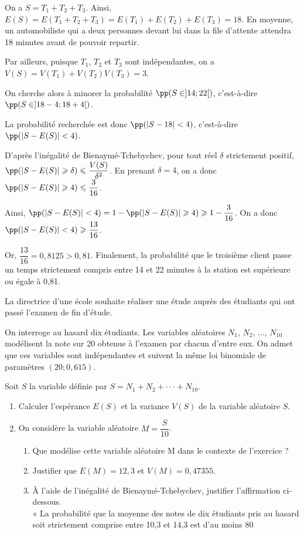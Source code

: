 \documentclass[11pt,fleqn, openany]{book} %
\begin{document}
\begin{solution}
On a $S=T_1+T_2+T_3$. Ainsi, $E(S)=E(T_1+T_2+T_3)=E(T_1)+E(T_2)+E(T_3)=18$. En moyenne, un automobiliste qui a deux personnes devant lui dans la file d'attente attendra 18 minutes avant de pouvoir repartir.

Par ailleurs, puisque $T_1$, $T_2$ et $T_3$ sont indépendantes, on a $V(S)=V(T_1)+V(T_2)V(T_3)=3$.

On cherche alors à minorer la probabilité $\pp(S \in ]14;22[)$, c'est-à-dire $\pp(S \in ]18-4;18+4[)$.

La probabilité recherchée est donc $\pp(|S-18|<4)$, c'est-à-dire $\pp(|S-E(S)|<4)$.

D'après l'inégalité de Bienaymé-Tchebychev, pour tout réel $\delta$ strictement positif, $\pp(|S-E(S)|\geqslant \delta) \leqslant \dfrac{V(S)}{\delta ^2}$. En prenant $\delta=4$, on a donc $\pp(|S-E(S)|\geqslant 4)\leqslant \dfrac{3}{16}$.

Ainsi, $\pp(|S-E(S)|<4)=1-\pp(|S-E(S)|\geqslant 4)\geqslant 1- \dfrac{3}{16}$. On a donc $\pp(|S-E(S)|<4)\geqslant \dfrac{13}{16}$. 

Or, $\dfrac{13}{16}=0,8125>0,81$. Finalement, la probabilité que le troisième client passe un temps strictement compris entre 14 et 22 minutes à la station est supérieure ou égale à 0,81.
\end{solution}

\begin{exercise}[subtitle={(Métropole 2024, jour 2)}]
La directrice d'une école souhaite réaliser une étude auprès des étudiants qui ont passé l'examen de fin d'étude.

On interroge au hasard dix étudiants. Les variables aléatoires $N_1$, $N_2$, ..., $N_{10}$ modélisent la note sur 20 obtenue à l'examen par chacun d'entre eux. On admet que ces variables sont indépendantes et suivent la même loi binomiale de paramètres $(20 ; 0,615)$.

Soit $S$ la variable définie par $S = N_1 + N_2 +··· + N_{10}$.
\begin{enumerate}
\item Calculer l'espérance $E(S)$ et la variance $V(S)$ de la variable aléatoire $S$.
\item On considère la variable aléatoire $M=\dfrac{S}{10}$.
\begin{enumerate}
\item Que modélise cette variable aléatoire M dans le contexte de l'exercice ?
\item Justifier que $E(M) = 12,3$ et $V (M) = 0,47355$.
\item À l'aide de l'inégalité de Bienaymé-Tchebychev, justifier l'affirmation ci-dessous. \\ « La probabilité que la moyenne des notes de dix étudiants pris au hasard soit
strictement comprise entre 10,3 et 14,3 est d'au moins 80%
\end{enumerate}
\end{enumerate}
\end{exercise}
\end{document}
